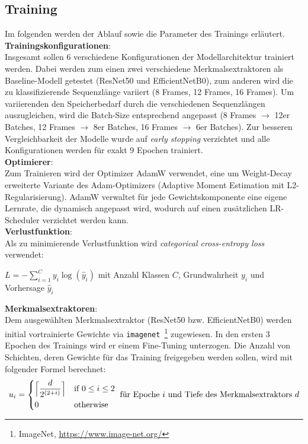 \documentclass{article}
\newcommand{\resnet}{ResNet50\xspace}
\newcommand{\effnet}{EfficientNetB0\xspace}
\begin{document}
\subsection{Training}\label{ssec:training}
Im folgenden werden der Ablauf sowie die Parameter des Trainings erläutert.
\\[0.5em]
\textbf{Trainingskonfigurationen}:\\
Insgesamt sollen 6 verschiedene Konfigurationen der Modellarchitektur trainiert werden.
Dabei werden zum einen zwei verschiedene Merkmalsextraktoren als Baseline-Modell getestet (\resnet und \effnet), zum anderen wird die zu klassifizierende Sequenzlänge variiert (8 Frames, 12 Frames, 16 Frames).
Um variierenden den Speicherbedarf durch die verschiedenen Sequenzlängen auszugleichen, wird die Batch-Size entsprechend angepasst (8 Frames $\rightarrow$ 12er Batches, 12 Frames $\rightarrow$ 8er Batches, 16 Frames $\rightarrow$ 6er Batches).
Zur besseren Vergleichbarkeit der Modelle wurde auf \textit{early stopping} verzichtet und alle Konfigurationen werden für exakt 9 Epochen trainiert.
\\[0.5em]
\textbf{Optimierer}:\\
Zum Trainieren wird der Optimizer AdamW verwendet, eine um Weight-Decay erweiterte Variante des Adam-Optimizers (Adaptive Moment Estimation mit L2-Regularisierung).
AdamW verwaltet für jede Gewichtskomponente eine eigene Lernrate, die dynamisch angepasst wird, wodurch auf einen zusätzlichen LR-Scheduler verzichtet werden kann.
\\[0.5em]
\textbf{Verlustfunktion}:\\
Als zu minimierende Verlustfunktion wird \textit{categorical cross-entropy loss} verwendet:
\begin{center}
    $\displaystyle L=-\sum_{i=1}^Cy_i\log(\hat y_i)$ mit Anzahl Klassen $C$, Grundwahrheit $y_i$ und Vorhersage $\hat y_i$
\end{center}
\textbf{Merkmalsextraktoren}:\\
Dem ausgewählten Merkmalsextraktor (\resnet bzw. \effnet) werden initial vortrainierte Gewichte via \texttt{imagenet}~\footnote{ImageNet, \url{https://www.image-net.org/}} zugewiesen.
In den ersten 3 Epochen des Trainings wird er einem Fine-Tuning unterzogen.
Die Anzahl von Schichten, deren Gewichte für das Training freigegeben werden sollen, wird mit folgender Formel berechnet:
\[
    u_i= 
    \begin{dcases}
        \Big\lceil\frac{d}{2^{(2+i)}}\Big\rceil & \text{if } 0\le i \le 2 \\
        0 & \text{otherwise}
    \end{dcases}
    \text{ für Epoche $i$ und Tiefe des Merkmalsextraktors $d$}
\]
\end{document}
